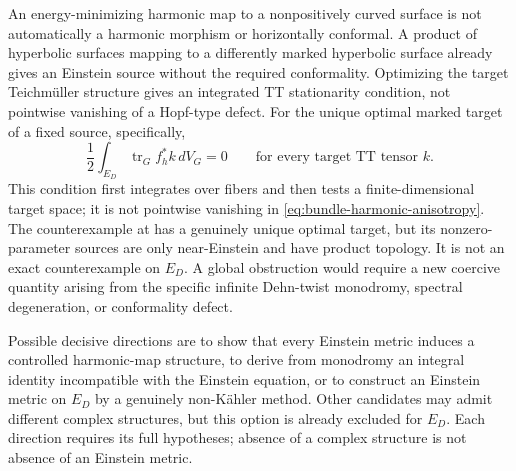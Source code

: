 \documentclass[a4paper,11pt]{article}
\numberwithin{equation}{section}
\theoremstyle{definition}
\newcommand{\tr}{\operatorname{tr}}
\begin{document}
An energy-minimizing harmonic map to a nonpositively curved surface is not automatically a harmonic morphism or horizontally conformal.
A product of hyperbolic surfaces mapping to a differently marked hyperbolic surface already gives an Einstein source without the required conformality.
Optimizing the target Teichm\"uller structure gives an integrated TT stationarity condition, not pointwise vanishing of a Hopf-type defect.
For the unique optimal marked target of a fixed source, specifically,
\begin{equation}\label{eq:bundle-optimal-target-condition}
 \frac12\int_{E_D}\tr_G f_h^*k\,dV_G=0
 \qquad\text{for every target TT tensor }k.
\end{equation}
This condition first integrates over fibers and then tests a finite-dimensional target space; it is not pointwise vanishing in \eqref{eq:bundle-harmonic-anisotropy}.
The counterexample at  has a genuinely unique optimal target, but its nonzero-parameter sources are only near-Einstein and have product topology. It is not an exact counterexample on $E_D$.
A global obstruction would require a new coercive quantity arising from the specific infinite Dehn-twist monodromy, spectral degeneration, or conformality defect.

Possible decisive directions are to show that every Einstein metric induces a controlled harmonic-map structure, to derive from monodromy an integral identity incompatible with the Einstein equation, or to construct an Einstein metric on $E_D$ by a genuinely non-K\"ahler method.
Other candidates may admit different complex structures, but this option is already excluded for $E_D$.
Each direction requires its full hypotheses; absence of a complex structure is not absence of an Einstein metric.
\end{document}
